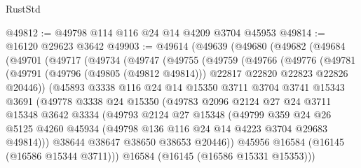\begin{lexlean}{RustStd}
\begin{coremodule}
@49812 := @49798 @114 @116 @24 @14 @4209 @3704 @45953
@49814 := @16120 @29623 @3642
@49903 := @49614
    (@49639
      (@49680
        (@49682
          (@49684
            (@49701
              (@49717
                (@49734
                  (@49747
                    (@49755
                      (@49759
                        (@49766
                          (@49776
                            (@49781
                              (@49791
                                (@49796 (@49805 (@49812 @49814)))
                                @22817
                                @22820
                                @22823
                                @22826
                                @20446))
                            (@45893
                              @3338
                              @116
                              @24
                              @14
                              @15350
                              @3711
                              @3704
                              @3741
                              @15343
                              @3691
                              (@49778
                                @3338
                                @24
                                @15350
                                (@49783
                                  @2096
                                  @2124
                                  @27
                                  @24
                                  @3711
                                  @15348
                                  @3642
                                  @3334
                                  (@49793
                                    @2124
                                    @27
                                    @15348
                                    (@49799
                                      @359
                                      @24
                                      @26
                                      @5125
                                      @4260
                                      @45934
                                      (@49798 @136 @116 @24 @14 @4223 @3704 @29683 @49814)))
                                  @38644
                                  @38647
                                  @38650
                                  @38653
                                  @20446))
                              @45956
                              @16584
                              (@16145 (@16586 @15344 @3711)))
                            @16584
                            (@16145 (@16586 @15331 @15353)))

\end{coremodule}
\end{lexlean}
